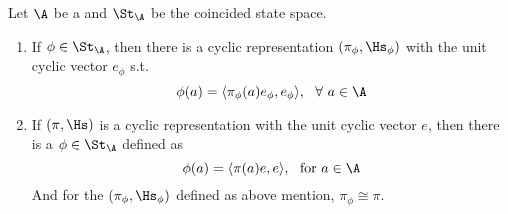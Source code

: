 \begin{thm}
	Let $\A$ be a \Cs and $\St_{\A}$ be the coincided state space.
	\begin{enumerate}[label=\arabic*)]
		\item If $\phi \in \St_{\A}$, then there is a cyclic representation $(\pi_{\phi},\Hs_{\phi})$ with the unit cyclic vector $e_{\phi}$ s.t.
		\begin{equation*}
			\phi(a) = \langle \pi_{\phi}(a)e_{\phi},e_{\phi} \rangle ,~~\forall~ a \in \A
		\end{equation*}
		\item If $(\pi,\Hs)$ is a cyclic representation with the unit cyclic vector $e$, then there is a $\phi \in \St_{\A}$ defined as 
		\begin{equation*}
			\phi(a) = \langle \pi(a)e, e \rangle,~~ \text{for}~ a \in \A
		\end{equation*}
		And for the $(\pi_{\phi},\Hs_{\phi})$ defined as above mention, $\pi_{\phi} \cong \pi$.
	\end{enumerate}
\end{thm}

